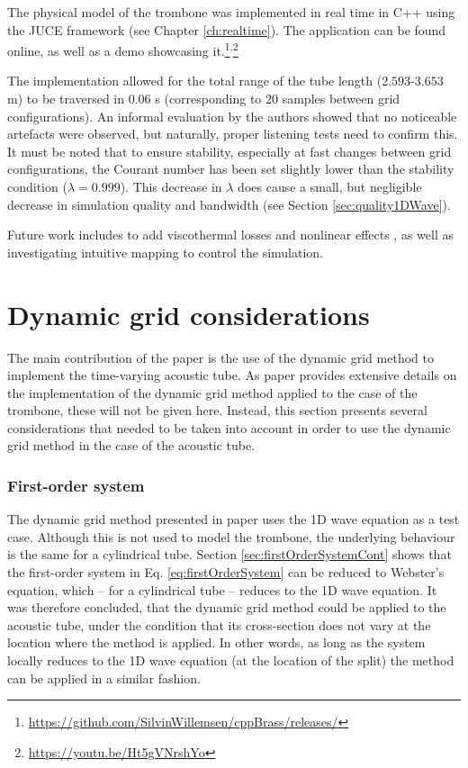 The physical model of the trombone was implemented in real time in C++ using the JUCE framework (see Chapter \ref{ch:realtime}). The application can be found online, as well as a demo showcasing it.\footnote{\url{https://github.com/SilvinWillemsen/cppBrass/releases/}}\textsuperscript{,}\footnote{\url{https://youtu.be/Ht5gVNrshYo}} 

The implementation allowed for the total range of the tube length ($2.593$-$3.653$ m) to be traversed in $0.06$ s (corresponding to 20 samples between grid configurations). An informal evaluation by the authors showed that no noticeable artefacts were observed, but naturally, proper listening tests need to confirm this. It must be noted that to ensure stability, especially at fast changes between grid configurations, the Courant number has been set slightly lower than the stability condition ($\lambda = 0.999$). This decrease in $\lambda$ does cause a small, but negligible decrease in simulation quality and bandwidth (see Section \ref{sec:quality1DWave}). 

Future work includes to add viscothermal losses \cite{Bilbao2016} and nonlinear effects \cite{msallam1997physical}, as well as investigating intuitive mapping to control the simulation.


\section{Dynamic grid considerations}
The main contribution of the paper is the use of the dynamic grid method to implement the time-varying acoustic tube. As paper \citeP[H] provides extensive details on the implementation of the dynamic grid method applied to the case of the trombone, these will not be given here. Instead, this section presents several considerations that needed to be taken into account in order to use the dynamic grid method in the case of the acoustic tube. 

\subsubsection{First-order system}
The dynamic grid method presented in paper \citeP[G] uses the 1D wave equation as a test case. Although this is not used to model the trombone, the underlying behaviour is the same for a cylindrical tube. Section \ref{sec:firstOrderSystemCont} shows that the first-order system in Eq. \eqref{eq:firstOrderSystem} can be reduced to Webster's equation, which -- for a cylindrical tube -- reduces to the 1D wave equation. It was therefore concluded, that the dynamic grid method could be applied to the acoustic tube, under the condition that its cross-section does not vary at the location where the method is applied. In other words, as long as the system locally reduces to the 1D wave equation (at the location of the split) the method can be applied in a similar fashion. 

